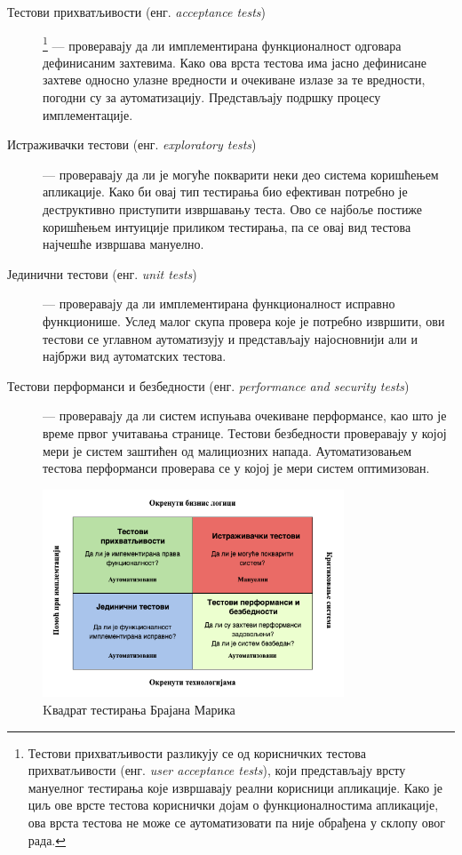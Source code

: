 \documentclass[12pt,oneside]{memoir}
\begin{document}
\begin{description}
\item[Тестови прихватљивости (енг. \textit{acceptance tests})]
\footnote{Тестови прихватљивости разликују се од корисничких тестова прихватљивости (енг. \textit{user acceptance tests}), који представљају врсту мануелног тестирања које извршавају реални корисници апликације. Како је циљ ове врсте тестова кориснички дојам о функционалностима апликације, ова врста тестова не може се аутоматизовати па није обрађена у склопу овог рада.}
--- проверавају да ли имплементирана функционалност  одговара дефинисаним захтевима. Како ова врста тестова има јасно дефинисане захтеве односно улазне вредности и очекиване излазе за те вредности, погодни су за аутоматизацију. Представљају подршку процесу имплементације.

\item[Истраживачки тестови (енг. \textit{exploratory tests})] --- проверавају да ли је могуће покварити неки део система коришћењем апликације. Како би овај тип тестирања био ефективан потребно је деструктивно приступити извршавању теста. Ово се најбоље постиже коришћењем интуиције приликом тестирања, па се овај вид тестова најчешће извршава мануелно.

\item[Јединични тестови (енг. \textit{unit tests})] --- проверавају да ли имплементирана функционалност исправно функционише. Услед малог скупа провера које је потребно извршити, ови тестови се углавном аутоматизују и представљају најосновнији али и најбржи вид аутоматских тестова.

\item[Тестови перформанси и безбедности (енг. \textit{performance and security tests})]  --- проверавају да ли систем испуњава очекиване перформансе, као што је време првог учитавања странице. Тестови безбедности проверавају у којој мери је систем заштићен од малициозних напада. Аутоматизовањем тестова перформанси проверава се у којој је мери систем оптимизован.
\end{description}



\begin{figure}[!ht]
  \centering
  \includegraphics[width=0.8\textwidth]{matfmaster/img/kvadrat2.png}
  \caption{Kвадрат тестирања Брајана Марика}
  \label{fig:kvadrat}
\end{figure}
\end{document}
